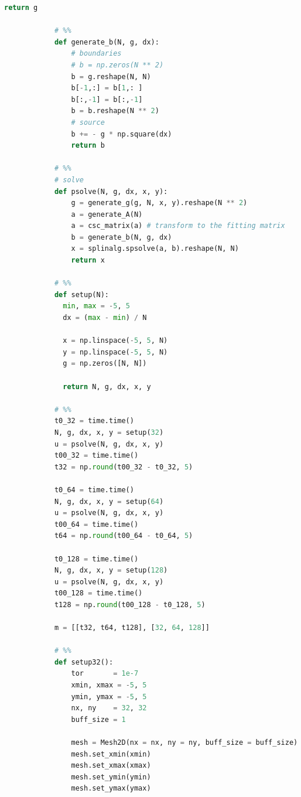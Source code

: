 \documentclass[12pt]{article}
\begin{document}
\begin{lstlisting}[language={Python}]
                return g
            
            # %%
            def generate_b(N, g, dx):
                # boundaries
                # b = np.zeros(N ** 2)
                b = g.reshape(N, N)
                b[-1,:] = b[1,: ]
                b[:,-1] = b[:,-1]
                b = b.reshape(N ** 2)
                # source
                b += - g * np.square(dx)
                return b
            
            # %%
            # solve
            def psolve(N, g, dx, x, y):
                g = generate_g(g, N, x, y).reshape(N ** 2)
                a = generate_A(N)
                a = csc_matrix(a) # transform to the fitting matrix
                b = generate_b(N, g, dx)
                x = splinalg.spsolve(a, b).reshape(N, N)
                return x
            
            # %%
            def setup(N):
              min, max = -5, 5
              dx = (max - min) / N
            
              x = np.linspace(-5, 5, N)
              y = np.linspace(-5, 5, N)
              g = np.zeros([N, N])
              
              return N, g, dx, x, y
            
            # %%
            t0_32 = time.time()
            N, g, dx, x, y = setup(32)
            u = psolve(N, g, dx, x, y)
            t00_32 = time.time()
            t32 = np.round(t00_32 - t0_32, 5)
            
            t0_64 = time.time()
            N, g, dx, x, y = setup(64)
            u = psolve(N, g, dx, x, y)
            t00_64 = time.time()
            t64 = np.round(t00_64 - t0_64, 5)
            
            t0_128 = time.time()
            N, g, dx, x, y = setup(128)
            u = psolve(N, g, dx, x, y)
            t00_128 = time.time()
            t128 = np.round(t00_128 - t0_128, 5)
            
            m = [[t32, t64, t128], [32, 64, 128]]
            
            # %%
            def setup32():
                tor       = 1e-7
                xmin, xmax = -5, 5
                ymin, ymax = -5, 5
                nx, ny    = 32, 32
                buff_size = 1
                
                mesh = Mesh2D(nx = nx, ny = ny, buff_size = buff_size)
                mesh.set_xmin(xmin)
                mesh.set_xmax(xmax)
                mesh.set_ymin(ymin)
                mesh.set_ymax(ymax)
            

\end{lstlisting}
\end{document}
